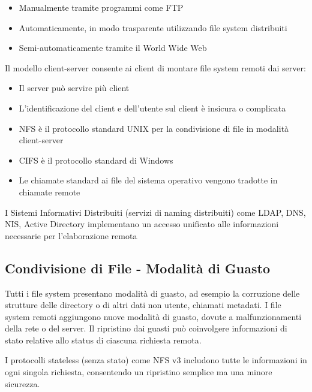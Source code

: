 \begin{itemize}
  \item Manualmente tramite programmi come FTP
  \item Automaticamente, in modo trasparente utilizzando file system distribuiti
  \item Semi-automaticamente tramite il World Wide Web
\end{itemize}

Il modello client-server consente ai client di montare file system remoti dai server:

\begin{itemize}
  \item Il server può servire più client
  \item L'identificazione del client e dell'utente sul client è insicura o complicata
  \item NFS è il protocollo standard UNIX per la condivisione di file in modalità client-server
  \item CIFS è il protocollo standard di Windows
  \item Le chiamate standard ai file del sistema operativo vengono tradotte in chiamate remote
\end{itemize}

I Sistemi Informativi Distribuiti (servizi di naming distribuiti) come LDAP, DNS, NIS, Active Directory implementano un accesso unificato alle informazioni necessarie per l'elaborazione remota


\subsection{Condivisione di File - Modalità di Guasto}

Tutti i file system presentano modalità di guasto, ad esempio la corruzione delle strutture delle directory o di altri dati non utente, chiamati metadati.
I file system remoti aggiungono nuove modalità di guasto, dovute a malfunzionamenti della rete o del server.
Il ripristino dai guasti può coinvolgere informazioni di stato relative allo status di ciascuna richiesta remota.

I protocolli stateless (senza stato) come NFS v3 includono tutte le informazioni in ogni singola richiesta, consentendo un ripristino semplice ma una minore sicurezza.



